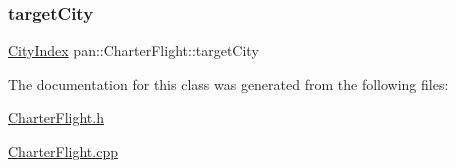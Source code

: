 \mbox{\label{classpan_1_1_charter_flight_a21a435071a78d4a57670fca2f5234b3f}} 
\subsubsection{\texorpdfstring{target\+City}{targetCity}}
{\footnotesize\ttfamily \hyperlink{namespacepan_afaed28aa6603153dcc062a028602d697}{City\+Index} pan\+::\+Charter\+Flight\+::target\+City}



The documentation for this class was generated from the following files\+:\begin{DoxyCompactItemize}
\item 
\hyperlink{_charter_flight_8h}{Charter\+Flight.\+h}\item 
\hyperlink{_charter_flight_8cpp}{Charter\+Flight.\+cpp}\end{DoxyCompactItemize}
